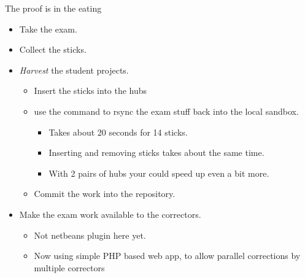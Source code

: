 \begin{frame}{The proof is in the eating}
  \begin{itemize}
  \item Take the exam.
  \item Collect the sticks.
  \item \textit{Harvest} the student projects.
    \begin{itemize}
    \item Insert the sticks into the hubs
    \item use the command  to rsync the exam stuff
      back into the local sandbox.
      \begin{itemize}
      \item Takes about 20 seconds for 14 sticks.\\
      \item Inserting and removing sticks takes about the same time.
    \item With 2 pairs of hubs your could speed up even a bit more.
    \end{itemize}
  \item Commit the work into the repository.
  \end{itemize}
  \item Make the exam work available to the correctors.
    \begin{itemize}
    \item Not netbeans plugin here yet\InlineMwha.
    \item Now using simple PHP based web app, to allow parallel
      corrections by multiple correctors
    \end{itemize}

  \end{itemize}
\end{frame}

